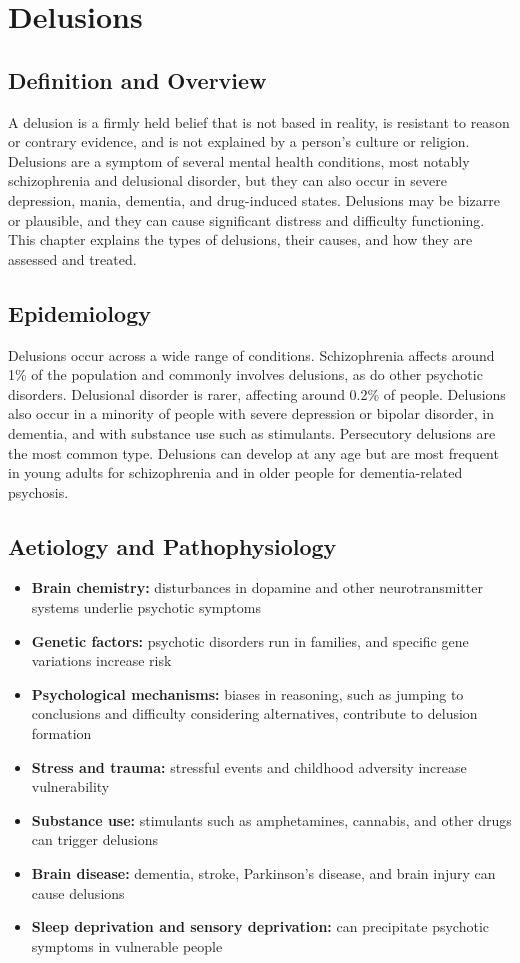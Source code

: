 \chapter{Delusions}

\section*{Definition and Overview}
A delusion is a firmly held belief that is not based in reality, is resistant to reason or contrary evidence, and is not explained by a person's culture or religion. Delusions are a symptom of several mental health conditions, most notably schizophrenia and delusional disorder, but they can also occur in severe depression, mania, dementia, and drug-induced states. Delusions may be bizarre or plausible, and they can cause significant distress and difficulty functioning. This chapter explains the types of delusions, their causes, and how they are assessed and treated.

\section*{Epidemiology}
Delusions occur across a wide range of conditions. Schizophrenia affects around 1\% of the population and commonly involves delusions, as do other psychotic disorders. Delusional disorder is rarer, affecting around 0.2\% of people. Delusions also occur in a minority of people with severe depression or bipolar disorder, in dementia, and with substance use such as stimulants. Persecutory delusions are the most common type. Delusions can develop at any age but are most frequent in young adults for schizophrenia and in older people for dementia-related psychosis.

\section*{Aetiology and Pathophysiology}
\begin{itemize}
    \item \textbf{Brain chemistry:} disturbances in dopamine and other neurotransmitter systems underlie psychotic symptoms
    \item \textbf{Genetic factors:} psychotic disorders run in families, and specific gene variations increase risk
    \item \textbf{Psychological mechanisms:} biases in reasoning, such as jumping to conclusions and difficulty considering alternatives, contribute to delusion formation
    \item \textbf{Stress and trauma:} stressful events and childhood adversity increase vulnerability
    \item \textbf{Substance use:} stimulants such as amphetamines, cannabis, and other drugs can trigger delusions
    \item \textbf{Brain disease:} dementia, stroke, Parkinson's disease, and brain injury can cause delusions
    \item \textbf{Sleep deprivation and sensory deprivation:} can precipitate psychotic symptoms in vulnerable people
\end{itemize}

